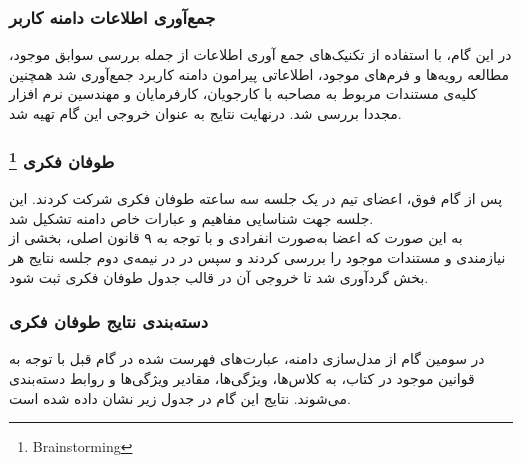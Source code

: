 \documentclass[12pt]{article}
\begin{document}
	\subsubsection{جمع‌آوری اطلاعات دامنه کاربر}
	در این گام، با استفاده از تکنیک‌های جمع آوری اطلاعات از جمله بررسی سوابق موجود، مطالعه رویه‌ها و فرم‌های موجود، اطلاعاتی پیرامون دامنه کاربرد جمع‌آوری شد همچنین کلیه‌ی مستندات مربوط به مصاحبه با کارجویان‌‌، کارفرمایان و مهندسین نرم افزار مجددا بررسی شد. درنهایت نتایج به عنوان خروجی این گام تهیه شد.

	\subsubsection{طوفان فکری \footnote{Brainstorming}}
	پس از گام فوق، اعضای تیم در یک جلسه سه ساعته طوفان فکری شرکت کردند. این جلسه جهت شناسایی مفاهیم و عبارات خاص دامنه تشکیل شد.\\
	به این صورت که اعضا به‌صورت انفرادی و با توجه به ۹ قانون اصلی، بخشی از نیازمندی و مستندات موجود را بررسی کردند و سپس در در نیمه‌ی دوم جلسه نتایج هر بخش گردآوری شد تا خروجی آن در قالب جدول طوفان فکری ثبت شود.

	\subsubsection{دسته‌بندی نتایج طوفان فکری}
	در سومین گام از مدل‌سازی دامنه، عبارت‌های فهرست شده در گام قبل با توجه به قوانین موجود در کتاب، به کلاس‌ها، ویژگی‌ها، مقادیر ویژگی‌ها و روابط دسته‌بندی می‌شوند.
	نتایج این گام در جدول زیر نشان داده شده است.
\end{document}
